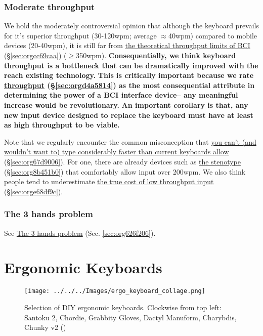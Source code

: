 \documentclass[logo,bsc,singlespacing,parskip]{infthesis}
\begin{document}
\subsection{Moderate throughput}
\label{sec:org36aaa2f}
We hold the moderately controversial opinion that although the keyboard prevails for it's superior throughput (30-120wpm; average \(\approx\)40wpm) compared to mobile devices (20-40wpm), it is still far from \hyperref[sec:orgcc69caa]{the theoretical throughput limits of BCI} (\S \ref{sec:orgcc69caa}) (\(\ge\)350wpm).
\textbf{Consequentially, we think keyboard throughput is a bottleneck that can be dramatically improved with the reach existing technology.}
\textbf{This is critically important because we rate \hyperref[sec:orgd4a5814]{throughput} (\S \ref{sec:orgd4a5814}) as the most consequential attribute in determining the power of a BCI interface device-- any meaningful increase would be revolutionary.}
\textbf{An important corollary is that, any new input device designed to replace the keyboard must have at least as high throughput to be viable.}

Note that we regularly encounter the common misconception that \hyperref[sec:org67d9006]{you can't (and wouldn't want to) type considerably faster than current keyboards allow} (\S \ref{sec:org67d9006}).
For one, there are already devices such as \hyperref[sec:org8b451b0]{the stenotype} (\S \ref{sec:org8b451b0}) that comfortably allow input over 200wpm.
We also think people tend to underestimate \hyperref[sec:orge68df9c]{the true cost of low throughput input} (\S \ref{sec:orge68df9c}).

\subsection{The 3 hands problem}
\label{sec:orgcfed86a}
See \hyperref[sec:org626f206]{The 3 hands problem} (Sec. \ref{sec:org626f206}).

\chapter{Ergonomic Keyboards}
\label{sec:org762b633}
\begin{figure}[h]
\centering
\texttt{[image: ../../../Images/ergo\_keyboard\_collage.png]}
\caption[Collage of ergonomic keyboards]{\label{fig:ergo_collage}Selection of DIY ergonomic keyboards. Clockwise from top left: Santoku 2, Chordie, Grabbity Gloves, Dactyl Manuform, Charybdis, Chunky v2  (\autocite{ErgoMechBoards})}
\end{figure}
\end{document}
